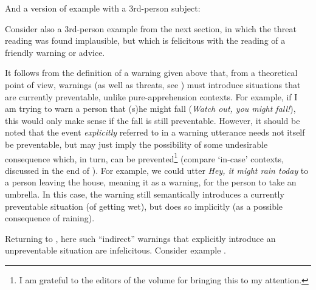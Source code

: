 \documentclass[output=paper,colorlinks,citecolor=brown]{langscibook}
\begin{document}
 And a version of example  with a 3rd-person subject:

\z

 Consider also a 3rd-person example  from the next section, in which the threat reading was found implausible, but which is felicitous with the reading of a friendly warning or advice.

It follows from the definition of a warning given above that, from a theoretical point of view, warnings (as well as threats, see ) must introduce situations that are currently preventable, unlike pure-apprehension contexts. For example, if I am trying to warn a person that (s)he might fall (\textit{Watch out, you might fall!}), this would only make sense if the fall is still preventable. However, it should be noted that the event \textit{explicitly} referred to in a warning utterance needs not itself be preventable, but may just imply the possibility of some undesirable consequence which, in turn, can be prevented\footnote{I am grateful to the editors of the volume for bringing this to my attention.} (compare `in-case' contexts, discussed in the end of ). For example, we could utter \textit{Hey, it might rain today} to a person leaving the house, meaning it as a warning,  for the person to take an umbrella. In this case, the warning still semantically introduces a currently preventable situation (of getting wet), but does so implicitly (as a possible consequence of raining).

Returning to , here such ``indirect'' warnings that explicitly introduce an unpreventable situation are infelicitous. Consider example .

\z
\end{document}
